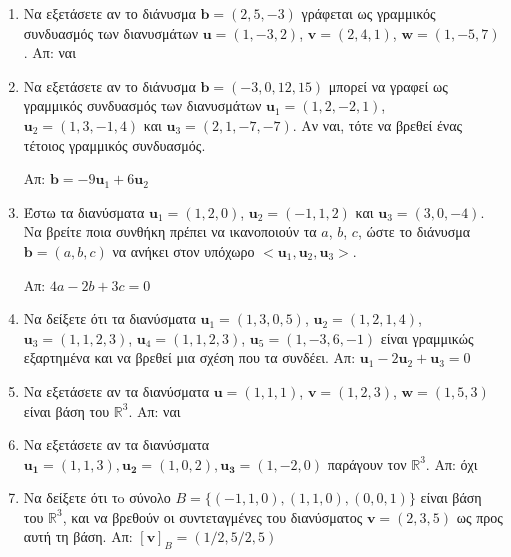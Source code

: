 \documentclass[a4paper,table]{report}
\begin{document}
\begin{enumerate}
  \item\label{ask:eksart2} Να εξετάσετε αν το διάνυσμα $ \mathbf{b} = (2,5,-3) $ 
    γράφεται ως γραμμικός συνδυασμός των διανυσμάτων $ \mathbf{u} = (1,-3,2)$, 
    $ \mathbf{v} = (2,4,1)$, $ \mathbf{w} = (1,-5,7) $.
    \hfill Απ: ναι 

  \item Να εξετάσετε αν το διάνυσμα $ \mathbf{b} = (-3,0,12,15) $ μπορεί να γραφεί 
    ως γραμμικός συνδυασμός των διανυσμάτων $ \mathbf{u}_{1} = (1,2,-2,1) $, 
    $ \mathbf{u}_{2} = (1,3,-1,4) $ και $ \mathbf{u}_{3} = (2,1,-7,-7) $. 
    Αν ναι, τότε να βρεθεί ένας τέτοιος γραμμικός συνδυασμός.

    \hfill Απ: $ \mathbf{b} = -9 \mathbf{u}_{1} + 6 \mathbf{u}_{2} $ 

  \item\label{ask:eksart3} Έστω τα διανύσματα $ \mathbf{u}_{1} = (1,2,0) $, 
    $ \mathbf{u}_{2} = (-1,1,2) $ 
    και $ \mathbf{u}_{3} = (3,0,-4) $. Να βρείτε ποια συνθήκη πρέπει να ικανοποιούν τα 
    $a$, $b$, $c$, ώστε το διάνυσμα $ \mathbf{b} = (a,b,c) $ να ανήκει στον υπόχωρο 
    $  < \mathbf{u}_{1}, \mathbf{u}_{2}, \mathbf{u}_{3} > $.

    \hfill Απ: $ 4a -2b + 3c = 0 $ 

  \item\label{ask:synd} Να δείξετε ότι τα διανύσματα $ \mathbf{u}_{1} = (1,3,0,5) $, 
    $ \mathbf{u}_{2} = (1,2,1,4) $, $ \mathbf{u}_{3} = (1,1,2,3)$, 
    $ \mathbf{u}_{4} = (1,1,2,3) $, $ \mathbf{u}_{5} = (1,-3,6,-1) $ 
    είναι γραμμικώς εξαρτημένα και να βρεθεί μια σχέση που τα συνδέει. 
    \hfill Απ: $ \mathbf{u}_{1} - 2 \mathbf{u}_{2} + \mathbf{u}_{3} = 0 $ 

  \item\label{ask:baseeks} Να εξετάσετε αν τα διανύσματα $ \mathbf{u} = (1,1,1)$, 
    $ \mathbf{v} = (1,2,3)$, $ \mathbf{w} = (1,5,3) $ είναι βάση του $\mathbb{R}^{3}$. 
    \hfill Απ: ναι 

  \item\label{ask:parag} Να εξετάσετε αν τα διανύσματα $ \mathbf{u_{1}} = (1,1,3), 
    \mathbf{u_{2}} = (1,0,2), \mathbf{u_{3}}= (1,-2,0)$ παράγουν τον $ \mathbb{R}^{3} $.
    \hfill Απ: όχι 

  \item Να δείξετε ότι τo σύνολο $ B = \{ (-1,1,0), (1,1,0), 
    (0,0,1) \} $ είναι βάση του 
    $ \mathbb{R}^{3} $, και να βρεθούν οι συντεταγμένες του διανύσματος 
    $ \mathbf{v} = (2,3,5) $ ως προς αυτή τη βάση.
    \hfill Απ: $ [\mathbf{v}]_{B} = (1/2,5/2,5) $ 


\end{enumerate}
\end{document}
